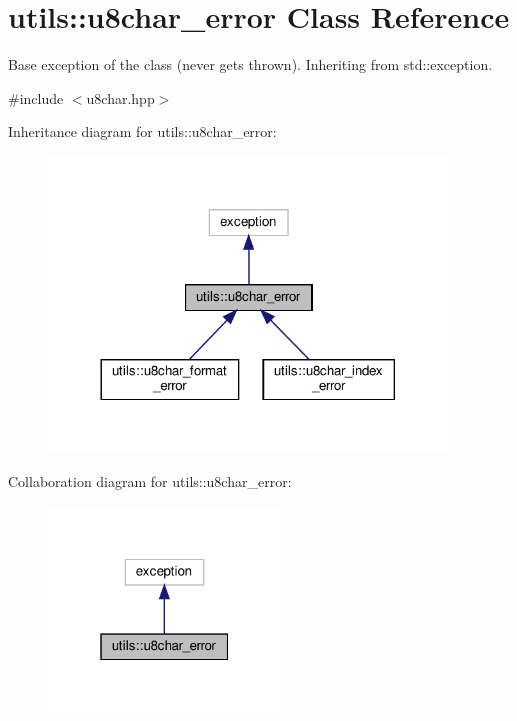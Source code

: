 \hypertarget{classutils_1_1u8char__error}{}\section{utils\+:\+:u8char\+\_\+error Class Reference}
\label{classutils_1_1u8char__error}


Base exception of the class (never gets thrown). Inheriting from std\+::exception.  




{\ttfamily \#include $<$u8char.\+hpp$>$}



Inheritance diagram for utils\+:\+:u8char\+\_\+error\+:\nopagebreak
\begin{figure}[H]
\begin{center}
\leavevmode
\includegraphics[width=300pt]{classutils_1_1u8char__error__inherit__graph}
\end{center}
\end{figure}


Collaboration diagram for utils\+:\+:u8char\+\_\+error\+:\nopagebreak
\begin{figure}[H]
\begin{center}
\leavevmode
\includegraphics[width=175pt]{classutils_1_1u8char__error__coll__graph}
\end{center}
\end{figure}


